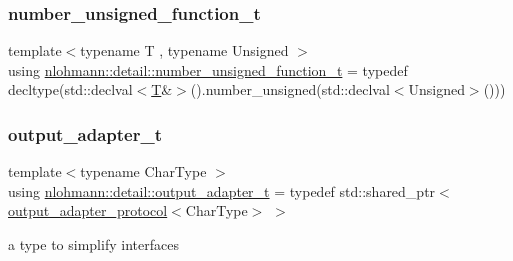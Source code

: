 \mbox{\label{namespacenlohmann_1_1detail_a74da7b17bda76f65d276feb18209c913}} 
\subsubsection{\texorpdfstring{number\_unsigned\_function\_t}{number\_unsigned\_function\_t}}
{\footnotesize\ttfamily template$<$typename T , typename Unsigned $>$ \\
using \mbox{\hyperlink{namespacenlohmann_1_1detail_a74da7b17bda76f65d276feb18209c913}{nlohmann\+::detail\+::number\+\_\+unsigned\+\_\+function\+\_\+t}} = typedef decltype(std\+::declval$<$\mbox{\hyperlink{_keyboard_event_8h_adf1f3edb9115acb0a1e04209b7a9937b}{T}}\&$>$().number\+\_\+unsigned(std\+::declval$<$Unsigned$>$()))}

\mbox{\label{namespacenlohmann_1_1detail_a9b680ddfb58f27eb53a67229447fc556}} 
\subsubsection{\texorpdfstring{output\_adapter\_t}{output\_adapter\_t}}
{\footnotesize\ttfamily template$<$typename Char\+Type $>$ \\
using \mbox{\hyperlink{namespacenlohmann_1_1detail_a9b680ddfb58f27eb53a67229447fc556}{nlohmann\+::detail\+::output\+\_\+adapter\+\_\+t}} = typedef std\+::shared\+\_\+ptr$<$\mbox{\hyperlink{structnlohmann_1_1detail_1_1output__adapter__protocol}{output\+\_\+adapter\+\_\+protocol}}$<$Char\+Type$>$ $>$}



a type to simplify interfaces 

\mbox{\label{namespacenlohmann_1_1detail_a264d4d58bc1fd82bcc7bf6bf73d6acad}} 
